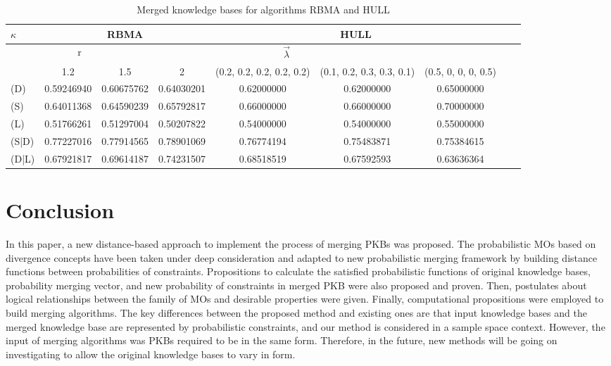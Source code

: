 \documentclass[]{iosart2c}
\begin{document}
    \begin{table*}[htb]
        \caption{Merged knowledge bases for algorithms RBMA and HULL}
        \begin{tabular}{|l|c|c|c|c|c|c|c|c|}
            \hline
            {$\kappa$} & \multicolumn{3}{|c|}{RBMA} & \multicolumn{3}{|c|}{HULL} \\
            \hline
            \multicolumn{3}{|c|}{r} & \multicolumn{3}{|c|}{$\vec{\lambda}$} \\
            \hline
            & 1.2        & 1.5        & 2          & (0.2, 0.2, 0.2, 0.2, 0.2) & (0.1, 0.2, 0.3, 0.3, 0.1) & (0.5, 0, 0, 0, 0.5) \\
            \hline
            (D)   & 0.59246940 & 0.60675762 & 0.64030201 & 0.62000000                & 0.62000000                & 0.65000000\\
            (S)   & 0.64011368 & 0.64590239 & 0.65792817 & 0.66000000                & 0.66000000                & 0.70000000\\
            (L)   & 0.51766261 & 0.51297004 & 0.50207822 & 0.54000000                & 0.54000000                & 0.55000000\\
            (S|D) & 0.77227016 & 0.77914565 & 0.78901069 & 0.76774194                & 0.75483871                & 0.75384615\\
            (D|L) & 0.67921817 & 0.69614187 & 0.74231507 & 0.68518519                & 0.67592593                & 0.63636364          \\
        \end{tabular}
    \end{table*}


    \section{Conclusion}

    In this paper, a new distance-based approach to implement the process of merging PKBs was proposed. The probabilistic MOs based on divergence concepts have been taken under deep consideration and adapted to new probabilistic merging framework by building distance functions between probabilities of constraints. Propositions to calculate the satisfied probabilistic functions of original knowledge bases, probability merging vector, and new probability of constraints in merged PKB were also proposed and proven. Then, postulates about logical relationships between the family of MOs and desirable properties were given. Finally, computational propositions were employed to build merging algorithms. The key differences between the proposed method and existing ones are that input knowledge bases and the merged knowledge base are represented by probabilistic constraints, and our method is considered in a sample space context. However, the input of merging algorithms was PKBs required to be in the same form. Therefore, in the future, new methods will be going on investigating to allow the original knowledge bases to vary in form.
\end{document}
